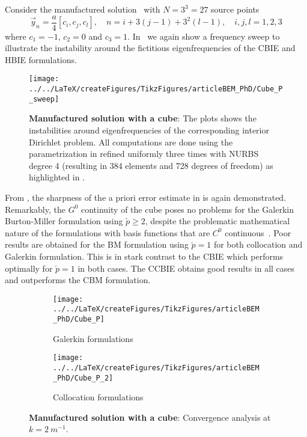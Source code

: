 Consider the manufactured solution~ with $N=3^3=27$ source points 
\begin{equation*}
	\vec{y}_n = \frac{a}{4}[c_i, c_j, c_l],\quad n=i+3(j-1)+3^2(l-1),\quad i,j,l=1,2,3
\end{equation*}
where $c_1=-1$, $c_2=0$ and $c_3=1$. In~ we again show a frequency sweep to illustrate the instability around the fictitious eigenfrequencies of the CBIE and HBIE formulations.
\begin{figure}
	\centering
	\texttt{[image: ../../LaTeX/createFigures/TikzFigures/articleBEM\_PhD/Cube\_P\_sweep]}
	\caption{\textbf{Manufactured solution with a cube}: The plots shows the instabilities around eigenfrequencies of the corresponding interior Dirichlet problem. All computations are done using the parametrization in  refined uniformly three times with NURBS degree 4 (resulting in 384 elements and 728 degrees of freedom) as highlighted in .}
	\label{Fig3:Cube_P_sweep}
\end{figure}
From , the sharpness of the a priori error estimate in  is again demonstrated. Remarkably, the $G^0$ continuity of the cube poses no problems for the Galerkin Burton-Miller formulation using $\check{p}\geq 2$, despite the problematic mathematical nature of the formulations with basis functions that are $C^0$ continuous~\cite{Liu1999anf}. Poor results are obtained for the BM formulation using $\check{p}=1$ for both collocation and Galerkin formulation. This is in stark contrast to the CBIE which performs optimally for $\check{p}=1$ in both cases. The CCBIE obtains good results in all cases and outperforms the CBM formulation.
\begin{figure}
	\centering
	\begin{subfigure}[t]{\textwidth}
		\texttt{[image: ../../LaTeX/createFigures/TikzFigures/articleBEM\_PhD/Cube\_P]}
		\caption{Galerkin formulations}
		\label{Fig3:Cube_P1}
	\end{subfigure} 
	\par\bigskip
	\par\bigskip
	\begin{subfigure}[t]{\textwidth}
		\texttt{[image: ../../LaTeX/createFigures/TikzFigures/articleBEM\_PhD/Cube\_P\_2]}
		\caption{Collocation formulations}
		\label{Fig3:Cube_P2}
	\end{subfigure} 
	\caption{\textbf{Manufactured solution with a cube}: Convergence analysis at $k=\SI{2}{m^{-1}}$.}
	\label{Fig3:Cube_P}
\end{figure}

